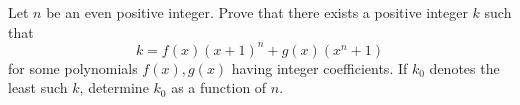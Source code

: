 Let $n$ be an even positive integer. Prove that there exists a positive integer $k$ such that
\[
k = f(x)(x + 1)^n + g(x)(x^n + 1)
\]
for some polynomials $f(x), g(x)$ having integer coefficients. If $k_0$ denotes the least such $k$, determine $k_0$ as a function of $n$.
